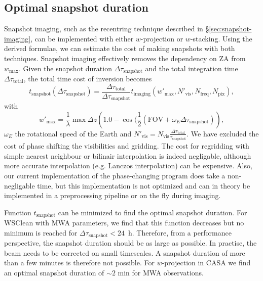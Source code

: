 \documentclass[useAMS,usenatbib]{mn2e}
\begin{document}
\subsection{Optimal snapshot duration}
Snapshot imaging, such as the recentring technique described in \S\ref{sec:snapshot-imaging}, can be implemented with either $w$-projection or $w$-stacking. Using the derived formulae, we can estimate the cost of making snapshots with both techniques. Snapshot imaging effectively removes the dependency on ZA from $w_{\max}$. Given the snapshot duration $\Delta \tau_\textrm{snapshot}$ and the total integration time $\Delta \tau_\textrm{total}$, the total time cost of inversion becomes
\begin{equation} \label{eq:snapshot-cost}
t_\textrm{snapshot}(\Delta \tau_\textrm{snapshot}) = \frac{\Delta \tau_\textrm{total}}{\Delta \tau_\textrm{snapshot}} t_\textrm{imaging}(w'_{\max},N'_\textrm{vis},N_\textrm{freq},N_\textrm{pix}),
\end{equation}
with
\begin{equation}
w'_{\max} = \frac{1}{\lambda}\max \Delta z \left(1.0 - \cos(\frac{1}{2}(\textrm{FOV} + \omega_E \Delta \tau_\textrm{snapshot})\right),
\end{equation}
$\omega_E$ the rotational speed of the Earth and $N'_\textrm{vis} = N_\textrm{vis}\frac{\Delta \tau_\textrm{total}}{\tau_\textrm{snapshot}}$. We have excluded the cost of phase shifting the visibilities and gridding. The cost for regridding with simple nearest neighbour or bilinair interpolation is indeed negligable, although more accurate interpolation (e.g. Lanczos interpolation) can be expensive. Also, our current implementation of the phase-changing program does take a non-negligable time, but this implementation is not optimized and can in theory be implemented in a preprocessing pipeline or on the fly during imaging.

Function $t_\textrm{snapshot}$ can be minimized to find the optimal snapshot duration. For WSClean with MWA parameters, we find that this function decreases but no minimum is reached for $\Delta \tau_\textrm{snapshot}<24$~h. Therefore, from a performance perspective, the snapshot duration should be as large as possible. In practise, the beam needs to be corrected on small timescales. A snapshot duration of more than a few minutes is therefore not possible. For $w$-projection in CASA we find an optimal snapshot duration of $\sim2$ min for MWA observations.
\end{document}
